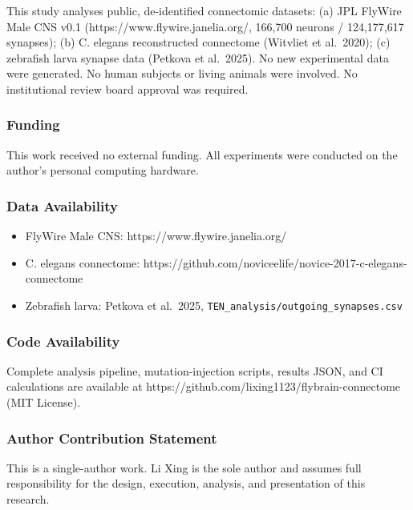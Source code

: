 \documentclass[
]{article}
\providecommand{\tightlist}{%
  \setlength{\itemsep}{0pt}\setlength{\parskip}{0pt}}
\begin{document}
This study analyses public, de-identified connectomic datasets: (a) JPL
FlyWire Male CNS v0.1 (https://www.flywire.janelia.org/, 166,700 neurons
/ 124,177,617 synapses); (b) C. elegans reconstructed connectome
(Witvliet et al.~2020); (c) zebrafish larva synapse data (Petkova et
al.~2025). No new experimental data were generated. No human subjects or
living animals were involved. No institutional review board approval was
required.

\subsubsection{Funding}\label{funding}

This work received no external funding. All experiments were conducted
on the author's personal computing hardware.

\subsubsection{Data Availability}\label{data-availability}

\begin{itemize}
\tightlist
\item
  FlyWire Male CNS: https://www.flywire.janelia.org/
\item
  C. elegans connectome:
  https://github.com/noviceelife/novice-2017-c-elegans-connectome
\item
  Zebrafish larva: Petkova et al.~2025,
  \texttt{TEN\_analysis/outgoing\_synapses.csv}
\end{itemize}

\subsubsection{Code Availability}\label{code-availability}

Complete analysis pipeline, mutation-injection scripts, results JSON,
and CI calculations are available at
https://github.com/lixing1123/flybrain-connectome (MIT License).

\subsubsection{Author Contribution
Statement}\label{author-contribution-statement}

This is a single-author work. Li Xing is the sole author and assumes
full responsibility for the design, execution, analysis, and
presentation of this research.
\end{document}
